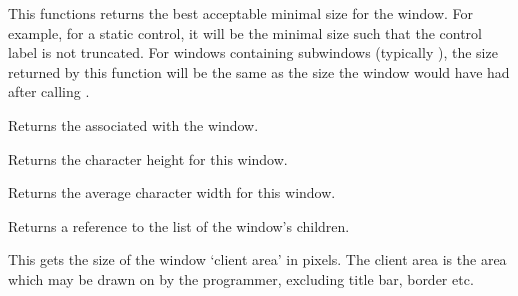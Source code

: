 
This functions returns the best acceptable minimal size for the window. For
example, for a static control, it will be the minimal size such that the
control label is not truncated. For windows containing subwindows (typically
), the size returned by this function will be the
same as the size the window would have had after calling
.

\label{wxwindowgetcaret}


Returns the  associated with the window.



Returns the character height for this window.



Returns the average character width for this window.



Returns a reference to the list of the window's children.

\label{wxwindowgetclientsize}




This gets the size of the window `client area' in pixels.  The client area is the
area which may be drawn on by the programmer, excluding title bar, border etc.





